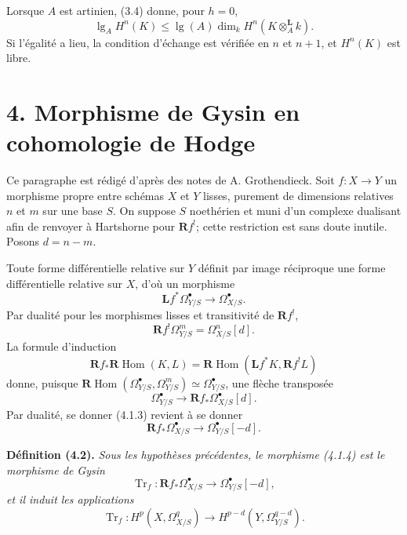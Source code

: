 \documentclass[11pt]{article}
\DeclareMathOperator{\Hom}{Hom}
\DeclareMathOperator{\Tr}{Tr}
\newcommand{\bR}{\mathbf R}
\newcommand{\bL}{\mathbf L}
\newcommand{\length}{\operatorname{lg}}
\newenvironment{named}[1]{\par\medskip\noindent\textbf{#1}\itshape}{\par\medskip}
\begin{document}
Lorsque $A$ est artinien, (3.4) donne, pour $h=0$,
\begin{equation}\tag{3.5.1}
\length_AH^n(K)\le\length(A)\dim_kH^n(K\otimes_A^\mathbf L k).
\end{equation}
Si l'égalité a lieu, la condition d'échange est vérifiée en $n$ et $n+1$, et $H^n(K)$ est libre.

\section*{4. Morphisme de Gysin en cohomologie de Hodge}
Ce paragraphe est rédigé d'après des notes de A. Grothendieck. Soit $f:X\to Y$ un morphisme propre entre schémas $X$ et $Y$ lisses, purement de dimensions relatives $n$ et $m$ sur une base $S$. On suppose $S$ noethérien et muni d'un complexe dualisant afin de renvoyer à Hartshorne pour $\bR f^!$; cette restriction est sans doute inutile. Posons $d=n-m$.

Toute forme différentielle relative sur $Y$ définit par image réciproque une forme différentielle relative sur $X$, d'où un morphisme
\begin{equation}\tag{4.1.1}
\bL f^*\Omega^\bullet_{Y/S}\longrightarrow \Omega^\bullet_{X/S}.
\end{equation}
Par dualité pour les morphismes lisses et transitivité de $\bR f^!$,
\begin{equation}\tag{4.1.2}
\bR f^!\Omega^m_{Y/S}=\Omega^n_{X/S}[d].
\end{equation}
La formule d'induction
\[
\bR f_*\bR\Hom(K,L)=\bR\Hom(\bL f^*K,\bR f^!L)
\]
donne, puisque $\bR\Hom(\Omega^\bullet_{Y/S},\Omega^m_{Y/S})\simeq\Omega^\bullet_{Y/S}$, une flèche transposée
\begin{equation}\tag{4.1.3}
\Omega^\bullet_{Y/S}\longrightarrow \bR f_*\Omega^\bullet_{X/S}[d].
\end{equation}
Par dualité, se donner (4.1.3) revient à se donner
\begin{equation}\tag{4.1.4}
\bR f_*\Omega^\bullet_{X/S}\longrightarrow \Omega^\bullet_{Y/S}[-d].
\end{equation}

\begin{named}{Définition (4.2).}
Sous les hypothèses précédentes, le morphisme (4.1.4) est le morphisme de Gysin
\[
\Tr_f:\bR f_*\Omega^\bullet_{X/S}\longrightarrow \Omega^\bullet_{Y/S}[-d],
\]
et il induit les applications
\[
\Tr_f:H^p(X,\Omega^q_{X/S})\longrightarrow H^{p-d}(Y,\Omega^{q-d}_{Y/S}).
\]
\end{named}
\end{document}
